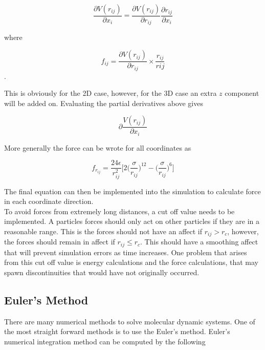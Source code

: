 \documentclass[reprint,amsmath,amssymb, aps, 10pt, a4paper, english, reqno]{revtex4-1}
\begin{document}
\begin{multicols}{2}
\begin{equation}
\frac{\partial V(r_{ij})}{\partial x_{i}} = \frac{\partial V(r_{ij})}{\partial r_{ij}} \frac{\partial r_{ij}}{\partial x_{i}}
\end{equation}

where

\begin{equation}
f_{ij} = \frac{\partial V(r_{ij})}{\partial r_{ij}} \times \frac{r_{ij}}{r{ij}}
\end{equation}.

This is obviously for the 2D case, however, for the 3D case an extra $z$ 
component will be added on. Evaluating the partial derivatives above gives

\begin{equation}
\partial \frac{V(r_{ij})}{\partial x_{i}} 
\end{equation}

More generally the force can be wrote for all coordinates as

\begin{equation}
f_{r_{ij}} = \frac{24\epsilon}{r^{2}_{ij}}\Bigg[2\Bigg(\frac{\sigma}{r_{ij}}\Bigg)^{12} - \Bigg(\frac{\sigma}{r_{ij}}\Bigg)^{6}\Bigg]
\end{equation}

The final equation can then be implemented into the simulation to calculate force in each coordinate direction. \\

To avoid forces from extremely long distances, a cut off value needs to be implemented. A particles forces should only act on other particles if they are in a reasonable range. This is the forces should not have an affect if $r_{ij} > r_{c}$, however, the forces should remain in affect if $r_{ij} \le r_{c}$. This should have a smoothing affect that will prevent simulation errors as time increases. One problem that arises from this cut off value is energy calculations and the force calculations, that may spawn discontinuities that would have not originally occurred.

\subsection{Euler's Method}

There are many numerical methods to solve molecular dynamic systems. One of the most straight forward methods is to use the Euler's method. Euler's numerical integration method can be computed by the following


\end{multicols}
\end{document}
